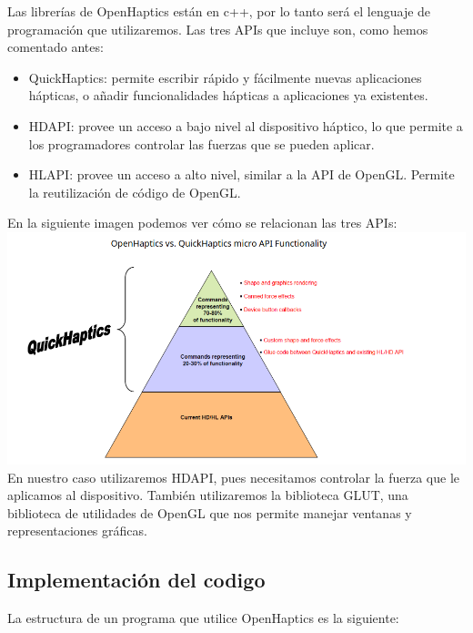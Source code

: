 \documentclass[a4paper,11pt, oneside]{book}
\begin{document}
Las librerías de OpenHaptics están en c++, por lo tanto será el lenguaje de programación que utilizaremos. Las tres APIs que incluye son, como hemos comentado antes:
\begin{itemize}
	\item QuickHaptics: permite escribir rápido y fácilmente nuevas aplicaciones hápticas, o añadir funcionalidades hápticas a aplicaciones ya existentes.  
	\item HDAPI: provee un acceso a bajo nivel al dispositivo háptico, lo que permite a los programadores controlar las fuerzas que se pueden aplicar. 
	\item HLAPI: provee un acceso a alto nivel, similar a la API de OpenGL. Permite la reutilización de código de OpenGL.
\end{itemize}
En la siguiente imagen podemos ver cómo se relacionan las tres APIs:
\\
\includegraphics[scale=0.4]{OPENHAPTICS}
\\

En nuestro caso utilizaremos HDAPI, pues necesitamos controlar la fuerza que le aplicamos al dispositivo. También utilizaremos la biblioteca GLUT, una biblioteca de utilidades de OpenGL que nos permite manejar ventanas y representaciones gráficas.

\subsection{Implementación del codigo}

La estructura de un programa que utilice OpenHaptics es la siguiente: 
\end{document}

